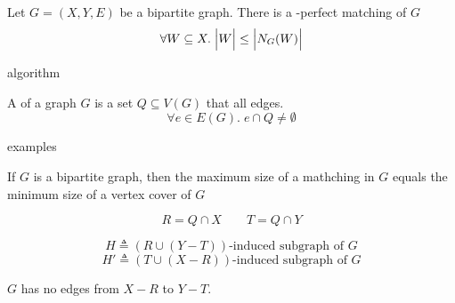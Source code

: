 \begin{frame}{}
  \begin{theorem}
    Let $G = (X, Y, E)$ be a bipartite graph.
    There is a -perfect matching of $G$ 
    \[
      \forall W \subseteq X.\; \Big\lvert W \Big\rvert \le \Big\lvert N_{G}(W) \Big\rvert
    \]
  \end{theorem}
\end{frame}

\begin{frame}{}
  algorithm
\end{frame}

\begin{frame}{}
  \begin{definitions}
    A  of a graph $G$ is a set $Q \subseteq V(G)$
    that  all edges.
    \[
      \forall e \in E(G).\; e \cap Q \neq \emptyset
    \]
  \end{definitions}

\end{frame}

\begin{frame}{}
\end{frame}

\begin{frame}{}
\end{frame}

\begin{frame}{}
    examples
\end{frame}

\begin{frame}{}
  \begin{theorem}
    If $G$ is a bipartite graph, then
    the maximum size of a mathching in $G$ equals
    the minimum size of a vertex cover of $G$
  \end{theorem}
\end{frame}

\begin{frame}{}

  \pause
  \[
    R = Q \cap X \qquad T = Q \cap Y
  \]

  \pause
  \[
    H \triangleq (R \cup (Y - T))\text{-induced subgraph of } G
  \]
  \[
    H' \triangleq (T \cup (X - R))\text{-induced subgraph of } G
  \]

  \pause
  \begin{center}
    $G$ has no edges from $X - R$ to $Y - T$.

    \pause
    \vspace{0.30cm}
  \end{center}
\end{frame}

